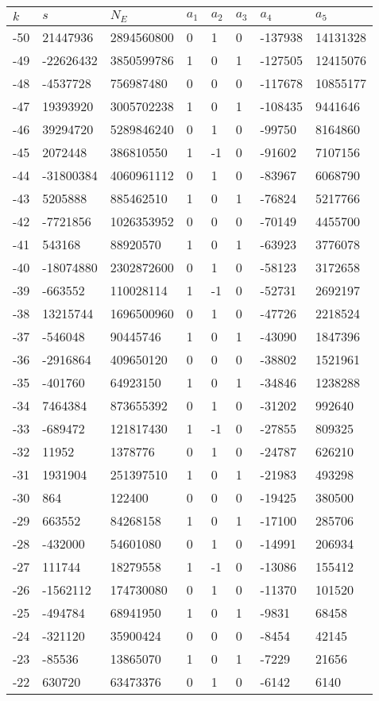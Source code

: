 \documentclass{amsart}
\begin{document}
\begin{longtable}{|l|l|l|lllll|}
\hline
$k$ & $s$ & $N_E$ & $a_1$ & $a_2$ & $a_3$ & $a_4$ & $a_5$\\
\hline
-50&21447936&2894560800&0&1&0&-137938&14131328\\
-49&-22626432&3850599786&1&0&1&-127505&12415076\\
-48&-4537728&756987480&0&0&0&-117678&10855177\\
-47&19393920&3005702238&1&0&1&-108435&9441646\\
-46&39294720&5289846240&0&1&0&-99750&8164860\\
-45&2072448&386810550&1&-1&0&-91602&7107156\\
-44&-31800384&4060961112&0&1&0&-83967&6068790\\
-43&5205888&885462510&1&0&1&-76824&5217766\\
-42&-7721856&1026353952&0&0&0&-70149&4455700\\
-41&543168&88920570&1&0&1&-63923&3776078\\
-40&-18074880&2302872600&0&1&0&-58123&3172658\\
-39&-663552&110028114&1&-1&0&-52731&2692197\\
-38&13215744&1696500960&0&1&0&-47726&2218524\\
-37&-546048&90445746&1&0&1&-43090&1847396\\
-36&-2916864&409650120&0&0&0&-38802&1521961\\
-35&-401760&64923150&1&0&1&-34846&1238288\\
-34&7464384&873655392&0&1&0&-31202&992640\\
-33&-689472&121817430&1&-1&0&-27855&809325\\
-32&11952&1378776&0&1&0&-24787&626210\\
-31&1931904&251397510&1&0&1&-21983&493298\\
-30&864&122400&0&0&0&-19425&380500\\
-29&663552&84268158&1&0&1&-17100&285706\\
-28&-432000&54601080&0&1&0&-14991&206934\\
-27&111744&18279558&1&-1&0&-13086&155412\\
-26&-1562112&174730080&0&1&0&-11370&101520\\
-25&-494784&68941950&1&0&1&-9831&68458\\
-24&-321120&35900424&0&0&0&-8454&42145\\
-23&-85536&13865070&1&0&1&-7229&21656\\
-22&630720&63473376&0&1&0&-6142&6140\\

\end{longtable}
\end{document}
